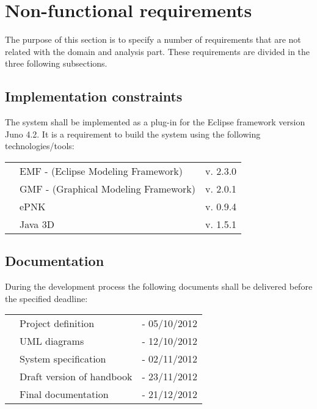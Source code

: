 \section{Non-functional requirements}

The purpose of this section is to specify a number of requirements that are not
related with the domain and analysis part. These requirements are divided in the three following subsections.

\subsection{Implementation constraints}

The system shall be implemented as a plug-in for the Eclipse framework version
Juno 4.2. It is a requirement to build the system using the following technologies/tools:

\begin{listliketab} 
  \begin{tabular}{Lll}
  	\textbullet & EMF - (Eclipse Modeling Framework) & v. 2.3.0 \\
  	\textbullet & GMF - (Graphical Modeling Framework) & v. 2.0.1 \\
  	\textbullet & ePNK & v. 0.9.4 \\
  	\textbullet & Java 3D & v. 1.5.1 
  \end{tabular} 
\end{listliketab}

\subsection{Documentation}

During the development process the following documents shall be delivered before
the specified deadline:

\begin{listliketab} 
  \begin{tabular}{Lll}
  	\textbullet & Project definition        & - 05/10/2012 \\
  	\textbullet & UML diagrams 		        & - 12/10/2012 \\
  	\textbullet & System specification 		& - 02/11/2012 \\
  	\textbullet & Draft version of handbook	& - 23/11/2012 \\
  	\textbullet & Final documentation		& - 21/12/2012
  \end{tabular} 
\end{listliketab}

